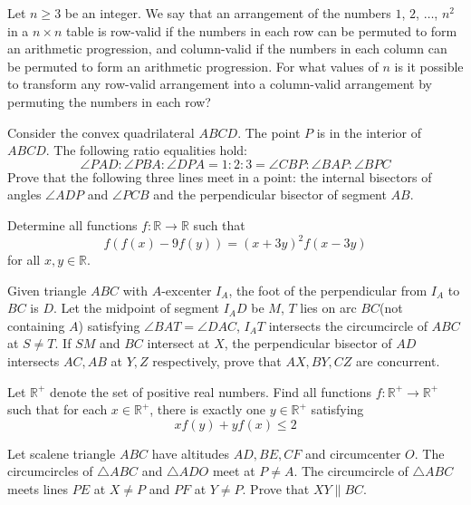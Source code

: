 \documentclass[11pt]{scrartcl}
\begin{document}
\begin{problem}[274933009357884]
Let $n\geq3$ be an integer. We say that an arrangement of the numbers $1$, $2$, $\dots$, $n^2$ in a $n \times n$ table is row-valid if the numbers in each row can be permuted to form an arithmetic progression, and column-valid if the numbers in each column can be permuted to form an arithmetic progression. For what values of $n$ is it possible to transform any row-valid arrangement into a column-valid arrangement by permuting the numbers in each row?
\end{problem}
\begin{problem}[915478364939250]
Consider the convex quadrilateral $ABCD$. The point $P$ is in the interior of $ABCD$. The following ratio equalities hold:
\[\angle PAD:\angle PBA:\angle DPA=1:2:3=\angle CBP:\angle BAP:\angle BPC\]Prove that the following three lines meet in a point: the internal bisectors of angles $\angle ADP$ and $\angle PCB$ and the perpendicular bisector of segment $AB$.
\end{problem}
\begin{problem}[646424364467534]
	Determine all functions $f:\mathbb{R} \rightarrow \mathbb{R}$ such that
$$f(f(x)-9f(y))=(x+3y)^2f(x-3y)$$for all $x,y\in \mathbb{R}$.
\end{problem}
\begin{problem}[5835156231907738776]
Given triangle $ABC$ with $A$-excenter $I_A$, the foot of the perpendicular from $I_A$ to $BC$ is $D$. Let the midpoint of segment $I_AD$ be $M$, $T$ lies on arc $BC$(not containing $A$) satisfying $\angle BAT=\angle DAC$, $I_AT$ intersects the circumcircle of $ABC$ at $S\neq T$. If $SM$ and $BC$ intersect at $X$, the perpendicular bisector of $AD$ intersects $AC,AB$ at $Y,Z$ respectively, prove that $AX,BY,CZ$ are concurrent.
\end{problem}
\begin{problem}[6558910862034852540]
Let $\mathbb{R}^+$ denote the set of positive real numbers. Find all functions $f: \mathbb{R}^+ \to \mathbb{R}^+$ such that for each $x \in \mathbb{R}^+$, there is exactly one $y \in \mathbb{R}^+$ satisfying$$xf(y)+yf(x) \leq 2$$
\end{problem}
\begin{problem}[9153191064326230951]
Let scalene triangle $ABC$ have altitudes $AD, BE, CF$ and circumcenter $O$. The circumcircles of $\triangle ABC$ and $\triangle ADO$ meet at $P \ne A$. The circumcircle of $\triangle ABC$ meets lines $PE$ at $X \ne P$ and $PF$ at $Y \ne P$. Prove that $XY \parallel BC$.
\end{problem}
\end{document}
